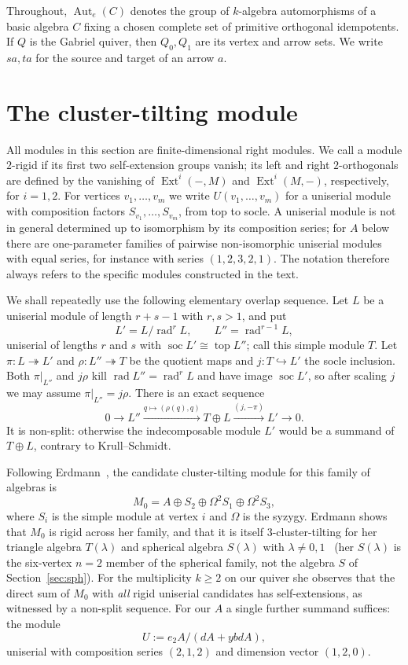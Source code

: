\documentclass[11pt]{amsart}
\theoremstyle{plain}
\theoremstyle{definition}
\DeclareMathOperator{\Ext}{Ext}
\DeclareMathOperator{\rad}{rad}
\DeclareMathOperator{\soc}{soc}
\DeclareMathOperator{\Aut}{Aut}
\begin{document}
Throughout, $\Aut_e(C)$ denotes the group of $k$-algebra automorphisms of a basic algebra $C$ fixing a chosen
complete set of primitive orthogonal idempotents. If $Q$ is the Gabriel quiver, then $Q_0,Q_1$ are its vertex
and arrow sets. We write $sa,ta$ for the source and target of an arrow $a$.

\section{The cluster-tilting module}\label{sec:RF}

All modules in this section are finite-dimensional right modules. We call a module $2$-rigid if its first two
self-extension groups vanish; its left and right $2$-orthogonals are defined by the vanishing of $\Ext^i(-,M)$
and $\Ext^i(M,-)$, respectively, for $i=1,2$. For vertices $v_1,\dots,v_m$ we write $U(v_1,\dots,v_m)$ for a
uniserial module with composition factors $S_{v_1},\dots,S_{v_m}$, from top to socle. A uniserial module is
not in general determined up to isomorphism by its composition series; for $A$ below there are one-parameter
families of pairwise non-isomorphic uniserial modules with equal series, for instance with series
$(1,2,3,2,1)$. The notation therefore always refers to the specific modules constructed in the text.

We shall repeatedly use the following elementary overlap sequence. Let $L$ be a uniserial module of length
$r+s-1$ with $r,s>1$, and put
\[
 L'=L/\rad^{r}L,\qquad L''=\rad^{r-1}L,
\]
uniserial of lengths $r$ and $s$ with $\soc L'\cong\operatorname{top}L''$; call this simple module $T$. Let
$\pi\colon L\twoheadrightarrow L'$ and $\rho\colon L''\twoheadrightarrow T$ be the quotient maps and $j\colon
T\hookrightarrow L'$ the socle inclusion. Both $\pi|_{L''}$ and $j\rho$ kill $\rad L''=\rad^rL$ and have image
$\soc L'$, so after scaling $j$ we may assume $\pi|_{L''}=j\rho$. There is an exact sequence
\begin{equation}\label{eq:overlap}
 0\longrightarrow L''\xrightarrow{q\mapsto(\rho(q),q)}T\oplus L
 \xrightarrow{(j,-\pi)}L'\longrightarrow0.
\end{equation}
It is non-split: otherwise the indecomposable module $L'$ would be a summand of $T\oplus L$, contrary to
Krull--Schmidt.

Following Erdmann~\cite{Erdmann}, the candidate cluster-tilting module for this family of algebras is
\[
  M_0 = A \oplus S_2 \oplus \Omega^2 S_1 \oplus \Omega^2 S_3,
\]
where $S_i$ is the simple module at vertex $i$ and $\Omega$ is the syzygy. Erdmann shows that $M_0$ is rigid
across her family, and that it is itself $3$-cluster-tilting for her triangle algebra $T(\lambda)$ and
spherical algebra $S(\lambda)$ with $\lambda\neq0,1$~\cite[Corollary~5.6]{Erdmann} (her $S(\lambda)$ is the
six-vertex $n=2$ member of the spherical family, not the algebra $S$ of Section~\ref{sec:sph}). For the
multiplicity $k\ge2$ on our quiver she observes that the direct sum of $M_0$ with \emph{all} rigid uniserial
candidates has self-extensions, as witnessed by a non-split sequence. For our $A$ a single further summand
suffices: the module
\[
 U:=e_2A/(dA+ybdA),
\]
uniserial with composition series $(2,1,2)$ and dimension vector $(1,2,0)$.
\end{document}
